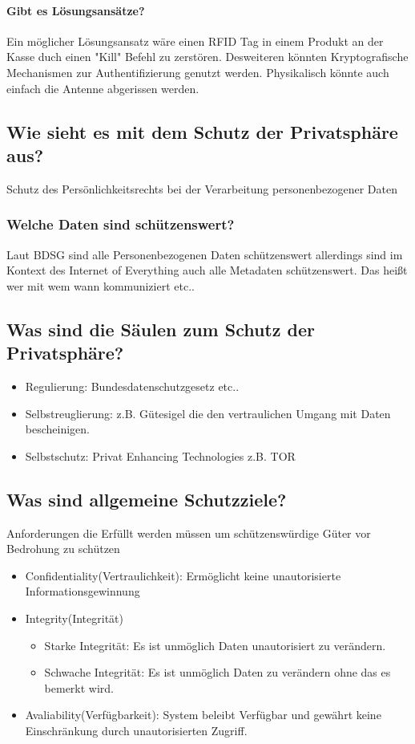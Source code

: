 	\paragraph{Gibt es Lösungsansätze?}
	Ein möglicher Lösungsansatz wäre einen RFID Tag in einem Produkt an der Kasse duch einen "Kill" Befehl zu zerstören.
	Desweiteren könnten Kryptografische Mechanismen zur Authentifizierung genutzt werden.
	Physikalisch könnte auch einfach die Antenne abgerissen werden.
	
	\subsection{Wie sieht es mit dem Schutz der Privatsphäre aus?}
	Schutz des Persönlichkeitsrechts bei der Verarbeitung personenbezogener Daten 
	\subsubsection{Welche Daten sind schützenswert?}
	Laut BDSG sind alle Personenbezogenen Daten schützenswert allerdings sind im Kontext des Internet of Everything auch alle Metadaten schützenswert. Das heißt wer mit wem wann kommuniziert etc..
	
	\subsection{Was sind die Säulen zum Schutz der Privatsphäre?}
	\begin{itemize}
		\item Regulierung: Bundesdatenschutzgesetz etc..
		\item Selbstreuglierung: z.B. Gütesigel die den vertraulichen Umgang mit Daten bescheinigen.
		\item Selbstschutz: Privat Enhancing Technologies z.B. TOR
	\end{itemize}
	
	\subsection{Was sind allgemeine Schutzziele?}
	Anforderungen die Erfüllt werden müssen um schützenswürdige Güter vor Bedrohung zu schützen
	\begin{itemize}
		\item Confidentiality(Vertraulichkeit): Ermöglicht keine unautorisierte Informationsgewinnung
		\item Integrity(Integrität)
		\begin{itemize}
			\item Starke Integrität: Es ist unmöglich Daten unautorisiert zu verändern.
			\item Schwache Integrität: Es ist unmöglich Daten zu verändern ohne das es bemerkt wird.			
		\end{itemize}
		\item Avaliability(Verfügbarkeit): System beleibt Verfügbar und gewährt keine Einschränkung durch unautorisierten Zugriff.
	\end{itemize}

